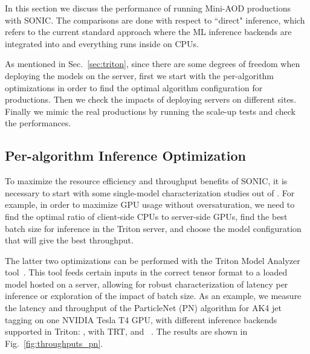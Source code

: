 In this section we discuss the performance of running Mini-AOD productions with SONIC. The comparisons are done with respect to ``direct" inference, which refers to the current standard approach where the ML inference backends are integrated into \CMSSW and everything runs inside \CMSSW on CPUs. 

As mentioned in Sec.~\ref{sec:triton}, since there are some degrees of freedom when deploying the models on the server, first we start with the per-algorithm optimizations in order to find the optimal algorithm configuration for productions. Then we check the impacts of deploying servers on different sites. Finally we mimic the real productions by running the scale-up tests and check the performances.

\subsection{Per-algorithm Inference Optimization}
\label{sec:algo_acceleration}

To maximize the resource efficiency and throughput benefits of SONIC, it is necessary to start with some single-model characterization studies out of \CMSSW. For example, in order to maximize GPU usage without oversaturation, we need to find the optimal ratio of client-side CPUs to server-side GPUs, find the best batch size for inference in the Triton server, and choose the model configuration that will give the best throughput.

The latter two optimizations can be performed with the Triton Model Analyzer tool~\cite{triton_model_analyzer}. This tool feeds certain inputs in the correct tensor format to a loaded model hosted on a server, allowing for robust characterization of latency per inference or exploration of the impact of batch size.
As an example, we measure the latency and throughput of the ParticleNet (PN) algorithm for AK4 jet tagging on one NVIDIA Tesla T4 GPU, with different inference backends supported in Triton: \ONNX, \ONNX with TRT, and \PYTORCH~\cite{pytorch}. %
The results are shown in Fig.~\ref{fig:throughputs_pn}. 

